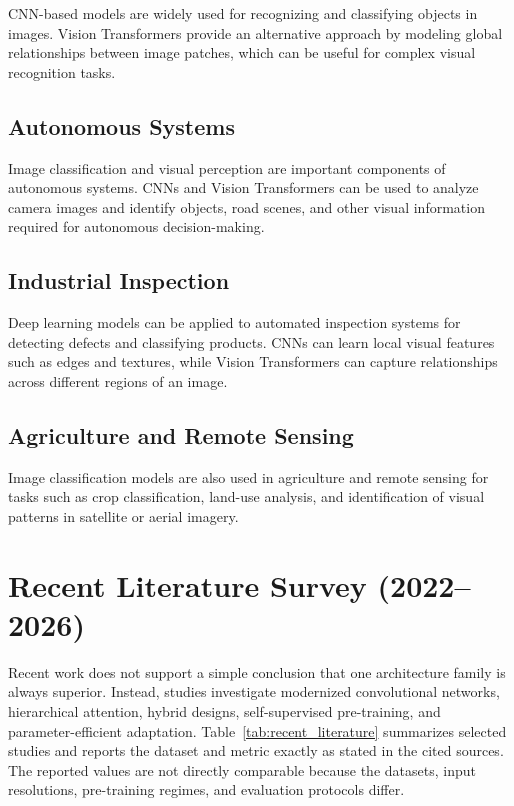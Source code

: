 \documentclass[conference]{IEEEtran}
\begin{document}
CNN-based models are widely used for recognizing and classifying objects in images. Vision Transformers provide an alternative approach by modeling global relationships between image patches, which can be useful for complex visual recognition tasks.

\subsection{Autonomous Systems}

Image classification and visual perception are important components of autonomous systems. CNNs and Vision Transformers can be used to analyze camera images and identify objects, road scenes, and other visual information required for autonomous decision-making.

\subsection{Industrial Inspection}

Deep learning models can be applied to automated inspection systems for detecting defects and classifying products. CNNs can learn local visual features such as edges and textures, while Vision Transformers can capture relationships across different regions of an image.

\subsection{Agriculture and Remote Sensing}

Image classification models are also used in agriculture and remote sensing for tasks such as crop classification, land-use analysis, and identification of visual patterns in satellite or aerial imagery.

\section{Recent Literature Survey (2022--2026)}

Recent work does not support a simple conclusion that one architecture family is always superior. Instead, studies investigate modernized convolutional networks, hierarchical attention, hybrid designs, self-supervised pre-training, and parameter-efficient adaptation. Table~\ref{tab:recent_literature} summarizes selected studies and reports the dataset and metric exactly as stated in the cited sources. The reported values are not directly comparable because the datasets, input resolutions, pre-training regimes, and evaluation protocols differ.
\end{document}
